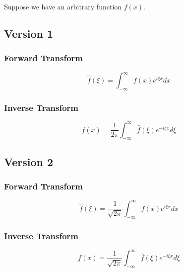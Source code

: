 \documentclass[11pt]{article}
\begin{document}
Suppose we have an arbitrary function $f(x)$.
\begin{center}
    \subsection*{Version 1}
\end{center}
\begin{minipage}{0.49\textwidth}
    \begin{center}
    \subsubsection*{Forward Transform}
        \begin{equation*}
            \hat{f}(\xi) = \int_{-\infty}^{\infty} f(x) e^{i \xi x} dx
        \end{equation*}
    \end{center}
\end{minipage}
\begin{minipage}{0.49\textwidth}
    \begin{center}
    \subsubsection*{Inverse Transform}
        \begin{equation*}
            f(x) = \frac{1}{2 \pi} \int_{-\infty}^{\infty} \hat{f}(\xi) e^{-i \xi x} d\xi
        \end{equation*}
    \end{center}
\end{minipage}

\begin{center}
    \subsection*{Version 2}
\end{center}
\begin{minipage}{0.49\textwidth}
    \begin{center}
    \subsubsection*{Forward Transform}
        \begin{equation*}
            \hat{f}(\xi) = \frac{1}{\sqrt{2 \pi}}\int_{-\infty}^{\infty} f(x) e^{i \xi x} dx
        \end{equation*}
    \end{center}
\end{minipage}
\begin{minipage}{0.49\textwidth}
    \begin{center}
    \subsubsection*{Inverse Transform}
        \begin{equation*}
            f(x) = \frac{1}{\sqrt{2 \pi}} \int_{-\infty}^{\infty} \hat{f}(\xi) e^{-i \xi x} d\xi
        \end{equation*}
    \end{center}
\end{minipage}
\end{document}
